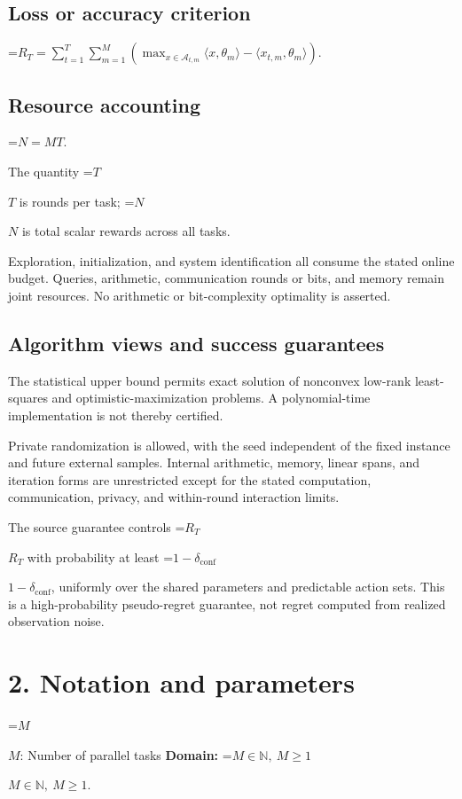 \documentclass[10pt,a4paper]{article}
\newcommand{\AtlasMath}[1]{\par\begingroup\centering\setbox0=\hbox{$\displaystyle #1$}\ifdim\wd0>1.4\linewidth\typeout{ATLAS WIDE FORMULA: \the\wd0}\fi\ifdim\wd0>\linewidth\resizebox{\linewidth}{!}{\box0}\else\box0\fi\par\endgroup}
\newcommand{\AtlasInlineMath}[1]{\begingroup\setbox0=\hbox{$#1$}\ifdim\wd0>.4\linewidth\endgroup\AtlasMath{#1}\else\endgroup$#1$\fi}
\begin{document}
\subsection{Loss or accuracy criterion}

\AtlasMath{R_T=\sum_{t=1}^{T}\sum_{m=1}^{M}\left(\max_{x\in\mathcal{A}_{t,m}}\langle x,\theta_m\rangle-\langle x_{t,m},\theta_m\rangle\right).}


\subsection{Resource accounting}

\AtlasMath{N=MT.}


The quantity \AtlasInlineMath{T} is rounds per task; \AtlasInlineMath{N} is total scalar rewards across all tasks.

Exploration, initialization, and system identification all consume the stated online budget. Queries, arithmetic, communication rounds or bits, and memory remain joint resources. No arithmetic or bit-complexity optimality is asserted.

\subsection{Algorithm views and success guarantees}
The statistical upper bound permits exact solution of nonconvex low-rank least-squares and optimistic-maximization problems. A polynomial-time implementation is not thereby certified.

Private randomization is allowed, with the seed independent of the fixed instance and future external samples. Internal arithmetic, memory, linear spans, and iteration forms are unrestricted except for the stated computation, communication, privacy, and within-round interaction limits.

The source guarantee controls \AtlasInlineMath{R_T} with probability at least \AtlasInlineMath{1-\delta_{\mathrm{conf}}}, uniformly over the shared parameters and predictable action sets. This is a high-probability pseudo-regret guarantee, not regret computed from realized observation noise.

\section{2. Notation and parameters}
\AtlasInlineMath{M}: Number of parallel tasks \textbf{Domain:} \AtlasInlineMath{M\in\mathbb N,\ M\ge1}.
\end{document}
